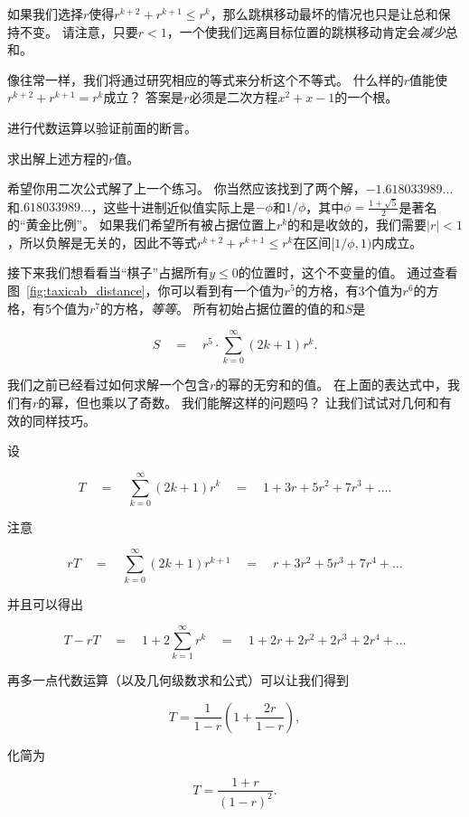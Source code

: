 如果我们选择$r$使得$r^{k+2} + r^{k+1} \leq r^k$，那么跳棋移动最坏的情况也只是让总和保持不变。
请注意，只要$r<1$，一个使我们远离目标位置的跳棋移动肯定会\emph{减少}总和。

像往常一样，我们将通过研究相应的等式来分析这个不等式。
什么样的$r$值能使$r^{k+2} + r^{k+1} = r^k$成立？
答案是$r$必须是二次方程$x^2+x-1$的一个根。

\begin{exer}
进行代数运算以验证前面的断言。
\end{exer}

\begin{exer}
求出解上述方程的$r$值。
\end{exer}

希望你用二次公式解了上一个练习。
你当然应该找到了两个解，$-1.618033989\ldots$和$.618033989\ldots$，这些十进制近似值实际上是$-\phi$和$1/\phi$，其中$\displaystyle \phi = \frac{1+\sqrt{5}}{2}$是著名的“黄金比例”。
如果我们希望所有被占据位置上$r^k$的和是收敛的，我们需要$|r|<1$，所以负解是无关的，因此不等式$r^{k+2} + r^{k+1} \leq r^k$在区间$[1/\phi, 1)$内成立。

接下来我们想看看当“棋子”占据所有$y\leq0$的位置时，这个不变量的值。
通过查看图~\ref{fig:taxicab_distance}，你可以看到有一个值为$r^5$的方格，有3个值为$r^6$的方格，有5个值为$r^7$的方格，\emph{等等}。
所有初始占据位置的值的和$S$是

\[ S \quad = \quad r^5 \cdot \sum_{k=0}^{\infty} (2k+1) r^k. \]

我们之前已经看过如何求解一个包含$r$的幂的无穷和的值。
在上面的表达式中，我们有$r$的幂，但也乘以了奇数。
我们能解这样的问题吗？
让我们试试对几何和有效的同样技巧。

设

\[ T \quad = \quad  \sum_{k=0}^{\infty} (2k+1) r^k \quad = \quad  1 + 3r + 5r^2 + 7r^3 + \ldots. \]

注意

\[ rT \quad = \quad  \sum_{k=0}^{\infty} (2k+1) r^{k+1} \quad = \quad  r + 3r^2 + 5r^3 + 7r^4 + \ldots \]

\noindent 并且可以得出

\[ T - rT \quad = \quad  1 + 2 \sum_{k=1}^{\infty} r^{k} \quad = \quad 1 + 2r + 2r^2 + 2r^3 + 2r^4 + \ldots \]

再多一点代数运算（以及几何级数求和公式）可以让我们得到

\[ T = \frac{1}{1-r}\left( 1 + \frac{2r}{1-r} \right), \]

\noindent
化简为

\[ T = \frac{1+r}{(1-r)^2}. \]


